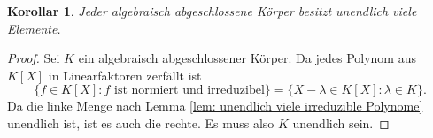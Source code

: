 \documentclass[a4paper,10pt]{article}
\newcounter{satze}
\newtheorem{kor}[satze]{Korollar}
\theoremstyle{definition}
\begin{document}
\begin{kor}
 Jeder algebraisch abgeschlossene Körper besitzt unendlich viele Elemente.
\end{kor}
\begin{proof}
 Sei $K$ ein algebraisch abgeschlossener Körper. Da jedes Polynom aus $K[X]$ in Linearfaktoren zerfällt ist
 \[
  \{f \in K[X] : f \text{ ist normiert und irreduzibel}\} = \{X-\lambda \in K[X] : \lambda \in K\}.
 \]
 Da die linke Menge nach Lemma \ref{lem: unendlich viele irreduzible Polynome} unendlich ist, ist es auch die rechte. Es muss also $K$ unendlich sein.
\end{proof}
\end{document}
